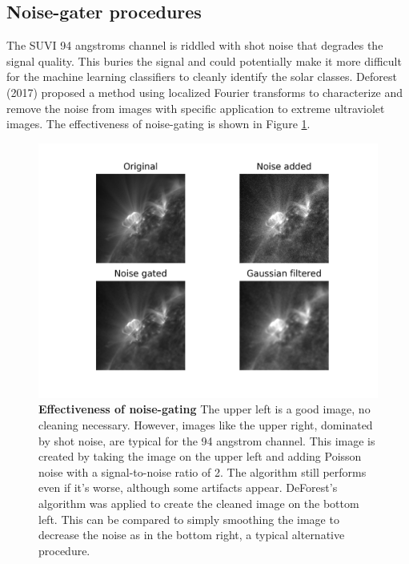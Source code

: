 \documentclass[twoside]{report}
\begin{document}
\subsection{Noise-gater procedures}
The SUVI 94 angstroms channel is riddled with shot noise that degrades the signal quality. This buries the signal and could potentially make it more difficult for the machine learning classifiers to cleanly identify the solar classes. Deforest (2017) proposed a method using localized Fourier transforms to characterize and remove the noise from images with specific application to extreme ultraviolet images. The effectiveness of noise-gating is shown in Figure \ref{fig:noise-gate-example}.

\begin{figure}[ht]
  \begin{center}
    \includegraphics[scale=0.8]{noise-gate.png}
    \caption{{\bf Effectiveness of noise-gating} The upper left is a good image, no cleaning necessary. However, images like the upper right, dominated by shot noise, are typical for the 94 angstrom channel. This image is created by taking the image on the upper left and adding Poisson noise with a signal-to-noise ratio of 2. The algorithm still performs even if it's worse, although some artifacts appear. DeForest's algorithm was applied to create the cleaned image on the bottom left. This can be compared to simply smoothing the image to decrease the noise as in the bottom right, a typical alternative procedure.}
    \label{fig:noise-gate-example}
 \end{center}
\end{figure}
\end{document}
